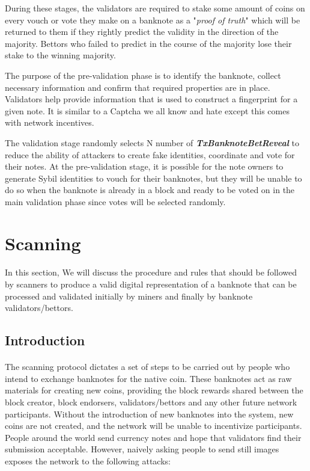  During these stages, the validators are required to stake some amount of coins on every vouch or vote they make on a banknote as a "\textit{proof of truth}" which will be returned to them if they rightly predict the validity in the direction of the majority.  Bettors who failed to predict in the course of the majority lose their stake to the winning majority.  
 
 The purpose of the pre-validation phase is to identify the banknote, collect necessary information and confirm that required properties are in place. Validators help provide information that is used to construct a fingerprint for a given note. It is similar to a Captcha we all know and hate except this comes with network incentives. 
 
The validation stage randomly selects N number of \textbf{\textit{TxBanknoteBetReveal}} to reduce the ability of attackers to create fake identities, coordinate and vote for their notes. At the pre-validation stage, it is possible for the note owners to generate Sybil identities to vouch for their banknotes, but they will be unable to do so when the banknote is already in a block and ready to be voted on in the main validation phase since votes will be selected randomly. 

\section{Scanning}

\paragraph{}In this section, We will discuss the procedure and rules that should be followed by scanners to produce a valid digital representation of a banknote that can be processed and validated initially by miners and finally by banknote validators/bettors.



\subsection{Introduction}

\paragraph{}The scanning protocol dictates a set of steps to be carried out by people who intend to exchange banknotes for the native coin. These banknotes act as raw materials for creating new coins, providing the block rewards shared between the block creator, block endorsers, validators/bettors and any other future network participants. Without the introduction of new banknotes into the system, new coins are not created, and the network will be unable to incentivize participants. People around the world send currency notes and hope that validators find their submission acceptable. However, naively asking people to send still images exposes the network to the following attacks:


